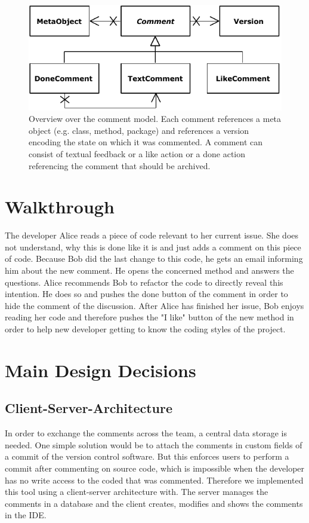 \documentclass[10pt, conference]{IEEEtran}
\begin{document}
\begin{figure}[t!]
\includegraphics[width=\columnwidth]{images/Overview.pdf}
\caption{Overview over the comment model. Each comment references a meta object (e.g. class, method, package) and references a version encoding the state on which it was commented. A comment can consist of textual feedback or a like action or a done action referencing the comment that should be archived.}
\label{overview}
\end{figure}
\section{Walkthrough}
The developer Alice reads a piece of code relevant to her current issue.
%
She does not understand, why this is done like it is and just adds a comment on this piece of code. 
%
Because Bob did the last change to this code, he gets an email informing him about the new comment. 
%
He opens the concerned method and answers the questions. 
%
Alice recommends Bob to refactor the code to directly reveal this intention.
%
He does so and pushes the done button of the comment in order to hide the comment of the discussion. 
%
After Alice has finished her issue, Bob enjoys reading her code and therefore pushes the "I like" button of the new method in order to help new developer getting to know the coding styles of the project. 

\section{Main Design Decisions}

\subsection{Client-Server-Architecture}
In order to exchange the comments across the team, a central data storage is needed. 
%
One simple solution would be to attach the comments in custom fields of a commit of the version control software. 
%
But this enforces users to perform a commit after commenting on source code, which is impossible when the developer has no write access to the coded that was commented. 
%
Therefore we implemented this tool using a client-server architecture with. 
%
The server manages the comments in a database and the client creates, modifies and shows the comments in the IDE. 
\end{document}

